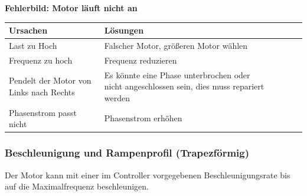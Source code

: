 {\textbf{Fehlerbild: Motor läuft nicht an} 
	\begin{center}
		\fontsize{8}{10}\selectfont
		\begin{tabularx}{\textwidth}{|X|X|X|X|X|X|}
			\hline 
			\textbf{Ursachen} & \textbf{Lösungen} \\ \hline
			Last zu Hoch & Falscher Motor, größeren Motor wählen \\ \hline
			Frequenz zu hoch & Frequenz reduzieren\\ \hline
			Pendelt der Motor von Links nach Rechts & Es könnte eine Phase unterbrochen oder nicht angeschlossen sein, dies muss repariert werden \\ \hline
			Phasenstrom passt nicht & Phasenstrom erhöhen\\ \hline
			
		\end{tabularx}
		 \label{MOTLNA} 
	\end{center}
	
	
	\subsubsection{Beschleunigung und Rampenprofil (Trapezförmig)}
	
	Der Motor kann mit einer im Controller vorgegebenen Beschleunigungsrate bis auf die Maximalfrequenz beschleunigen.\cite{FaulhaberDriveSystems.2020} 
	
}
